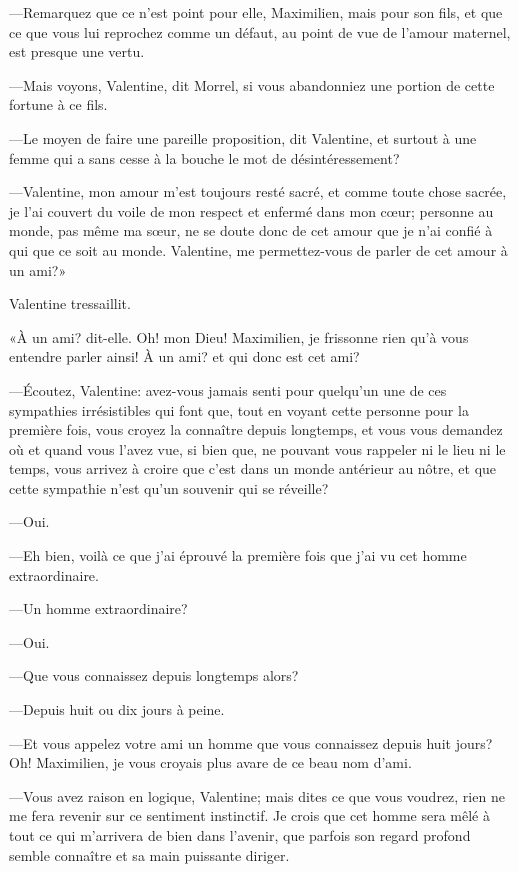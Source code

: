 —Remarquez que ce n'est point pour elle, Maximilien, mais pour son fils, et que ce que vous lui reprochez comme un défaut, au point de vue de l'amour maternel, est presque une vertu. 

—Mais voyons, Valentine, dit Morrel, si vous abandonniez une portion de cette fortune à ce fils. 

—Le moyen de faire une pareille proposition, dit Valentine, et surtout à une femme qui a sans cesse à la bouche le mot de désintéressement? 

—Valentine, mon amour m'est toujours resté sacré, et comme toute chose sacrée, je l'ai couvert du voile de mon respect et enfermé dans mon cœur; personne au monde, pas même ma sœur, ne se doute donc de cet amour que je n'ai confié à qui que ce soit au monde. Valentine, me permettez-vous de parler de cet amour à un ami?» 

Valentine tressaillit. 

«À un ami? dit-elle. Oh! mon Dieu! Maximilien, je frissonne rien qu'à vous entendre parler ainsi! À un ami? et qui donc est cet ami? 

—Écoutez, Valentine: avez-vous jamais senti pour quelqu'un une de ces sympathies irrésistibles qui font que, tout en voyant cette personne pour la première fois, vous croyez la connaître depuis longtemps, et vous vous demandez où et quand vous l'avez vue, si bien que, ne pouvant vous rappeler ni le lieu ni le temps, vous arrivez à croire que c'est dans un monde antérieur au nôtre, et que cette sympathie n'est qu'un souvenir qui se réveille? 

—Oui. 

—Eh bien, voilà ce que j'ai éprouvé la première fois que j'ai vu cet homme extraordinaire. 

—Un homme extraordinaire? 

—Oui. 

—Que vous connaissez depuis longtemps alors? 

—Depuis huit ou dix jours à peine. 

—Et vous appelez votre ami un homme que vous connaissez depuis huit jours? Oh! Maximilien, je vous croyais plus avare de ce beau nom d'ami. 

—Vous avez raison en logique, Valentine; mais dites ce que vous voudrez, rien ne me fera revenir sur ce sentiment instinctif. Je crois que cet homme sera mêlé à tout ce qui m'arrivera de bien dans l'avenir, que parfois son regard profond semble connaître et sa main puissante diriger. 

